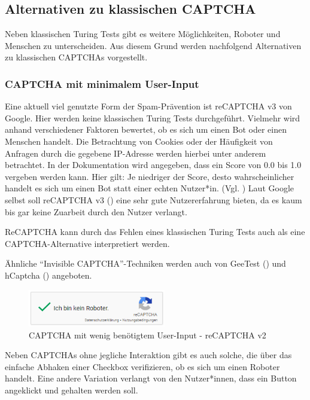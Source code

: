 \subsection{Alternativen zu klassischen CAPTCHA}
\label{ch:basics:captcha:alternativen}
Neben klassischen Turing Tests gibt es weitere Möglichkeiten, Roboter und Menschen zu unterscheiden.
Aus diesem Grund werden nachfolgend Alternativen zu klassischen CAPTCHAs vorgestellt.

\subsubsection*{CAPTCHA mit minimalem User-Input}
Eine aktuell viel genutzte Form der Spam-Prävention ist reCAPTCHA v3 von Google. 
Hier werden keine klassischen Turing Tests durchgeführt. 
Vielmehr wird anhand verschiedener Faktoren bewertet, ob es sich um einen Bot oder einen Menschen handelt.
Die Betrachtung von Cookies oder der Häufigkeit von Anfragen durch die gegebene IP-Adresse werden hierbei unter anderem betrachtet.
In der Dokumentation wird angegeben, dass ein Score von 0.0 bis 1.0 vergeben werden kann. 
Hier gilt: Je niedriger der Score, desto wahrscheinlicher handelt es sich um einen Bot statt einer echten Nutzer*in. (Vgl. \cite{recaptchadoc})
Laut Google selbst soll reCAPTCHA v3 (\cite{googleblog:recaptcha}) eine sehr gute Nutzererfahrung bieten, da es kaum bis gar keine Zuarbeit durch den Nutzer verlangt. 

ReCAPTCHA kann durch das Fehlen eines klassischen Turing Tests auch als eine CAPTCHA-Alternative interpretiert werden.

Ähnliche ``Invisible CAPTCHA''-Techniken werden auch von GeeTest \linebreak(\cite{geetest}) und hCaptcha (\cite{hcaptcha}) angeboten.

\begin{figure}[h!]
    \centering\includegraphics[width=6cm]{gfx/mygraphics/recaptcha.png}
     \caption{CAPTCHA mit wenig benötigtem User-Input - reCAPTCHA v2}
      \label{fig:recaptcha}
\end{figure}

\pagebreak

Neben CAPTCHAs ohne jegliche Interaktion gibt es auch solche, 
die über das einfache Abhaken einer Checkbox verifizieren, ob es sich um einen Roboter handelt.
Eine andere Variation verlangt von den Nutzer*innen, dass ein Button angeklickt und gehalten werden soll. 

